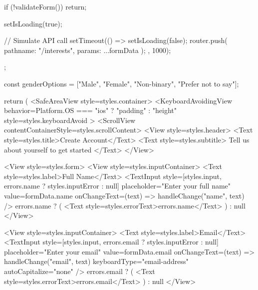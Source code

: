 {{    if (!validateForm()) return;

    setIsLoading(true);
    
    // Simulate API call
    setTimeout(() => {
      setIsLoading(false);
      router.push({
        pathname: "/interests",
        params: { ...formData }
      });
    }, 1000);
  };

  const genderOptions = ["Male", "Female", "Non-binary", "Prefer not to say"];

  return (
    <SafeAreaView style={styles.container}>
      <KeyboardAvoidingView
        behavior={Platform.OS === "ios" ? "padding" : "height"}
        style={styles.keyboardAvoid}
      >
        <ScrollView contentContainerStyle={styles.scrollContent}>
          <View style={styles.header}>
            <Text style={styles.title}>Create Account</Text>
            <Text style={styles.subtitle}>
              Tell us about yourself to get started
            </Text>
          </View>

          <View style={styles.form}>
            <View style={styles.inputContainer}>
              <Text style={styles.label}>Full Name</Text>
              <TextInput
                style={[styles.input, errors.name ? styles.inputError : null]}
                placeholder="Enter your full name"
                value={formData.name}
                onChangeText={(text) => handleChange("name", text)}
              />
              {errors.name ? (
                <Text style={styles.errorText}>{errors.name}</Text>
              ) : null}
            </View>

            <View style={styles.inputContainer}>
              <Text style={styles.label}>Email</Text>
              <TextInput
                style={[styles.input, errors.email ? styles.inputError : null]}
                placeholder="Enter your email"
                value={formData.email}
                onChangeText={(text) => handleChange("email", text)}
                keyboardType="email-address"
                autoCapitalize="none"
              />
              {errors.email ? (
                <Text style={styles.errorText}>{errors.email}</Text>
              ) : null}
            </View>

}
